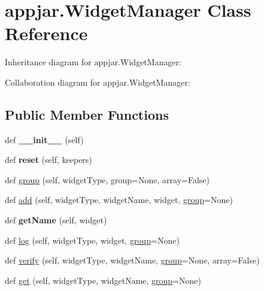 \hypertarget{classappjar_1_1_widget_manager}{}\section{appjar.\+Widget\+Manager Class Reference}
\label{classappjar_1_1_widget_manager}


Inheritance diagram for appjar.\+Widget\+Manager\+:


Collaboration diagram for appjar.\+Widget\+Manager\+:
\subsection*{Public Member Functions}
\begin{DoxyCompactItemize}
\item 
\mbox{\label{classappjar_1_1_widget_manager_a8819347997147cc793a35b7e3a40083f}} 
def {\bfseries \+\_\+\+\_\+init\+\_\+\+\_\+} (self)
\item 
\mbox{\label{classappjar_1_1_widget_manager_aa66dbf2d1bb0474a110754a7dbf282d2}} 
def {\bfseries reset} (self, keepers)
\item 
def \hyperlink{classappjar_1_1_widget_manager_a27966c0641e12877b49f89d68119777c}{group} (self, widget\+Type, group=None, array=False)
\item 
def \hyperlink{classappjar_1_1_widget_manager_a237b5408dafc346803d9df8053332fad}{add} (self, widget\+Type, widget\+Name, widget, \hyperlink{classappjar_1_1_widget_manager_a27966c0641e12877b49f89d68119777c}{group}=None)
\item 
\mbox{\label{classappjar_1_1_widget_manager_a5063f7a13ff6499871897700b69986e3}} 
def {\bfseries get\+Name} (self, widget)
\item 
def \hyperlink{classappjar_1_1_widget_manager_a24c5c2b761f77a0a379e6607315f48b4}{log} (self, widget\+Type, widget, \hyperlink{classappjar_1_1_widget_manager_a27966c0641e12877b49f89d68119777c}{group}=None)
\item 
def \hyperlink{classappjar_1_1_widget_manager_a267493893f210a5176a30793a32618c6}{verify} (self, widget\+Type, widget\+Name, \hyperlink{classappjar_1_1_widget_manager_a27966c0641e12877b49f89d68119777c}{group}=None, array=False)
\item 
def \hyperlink{classappjar_1_1_widget_manager_aa7f8a7e8180832988cb72181bb589701}{get} (self, widget\+Type, widget\+Name, \hyperlink{classappjar_1_1_widget_manager_a27966c0641e12877b49f89d68119777c}{group}=None)

\end{DoxyCompactItemize}
